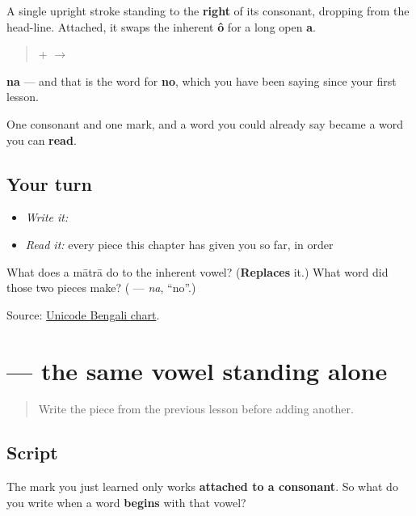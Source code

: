 A single upright stroke standing to the \textbf{right} of its consonant, dropping from the head-line. Attached, it swaps the inherent \textbf{ô} for a long open \textbf{a}.

\begin{quote}
\textbf{} + \textbf{} $\to$ \textbf{}
\end{quote}

\textbf{na} — and that is the word for \textbf{no}, which you have been saying since your first lesson.

One consonant and one mark, and a word you could already say became a word you can \textbf{read}.

\subsection*{Your turn}
\begin{itemize}
\raggedright
  \item \emph{Write it:} 
  \item \emph{Read it:} every piece this chapter has given you so far, in order
\end{itemize}

\begin{tcolorbox}[breakable,colback=teal!4,colframe=teal!35!black,title={Before you move on}]
What does a mātrā do to the inherent vowel? (\textbf{Replaces} it.) What word did those two pieces make? (\textbf{} — \emph{na}, \textquotedblleft{}no\textquotedblright{}.)

Source: \href{https://www.unicode.org/charts/PDF/U0980.pdf}{Unicode Bengali chart}.
\end{tcolorbox}
\section[a]{ — the same vowel standing alone}

\label{lesson:BN-W01-aa}



\begin{quote}
Write the piece from the previous lesson before adding another.
\end{quote}

\subsection*{Script}
The mark you just learned only works \textbf{attached to a consonant}. So what do you write when a word \textbf{begins} with that vowel?

